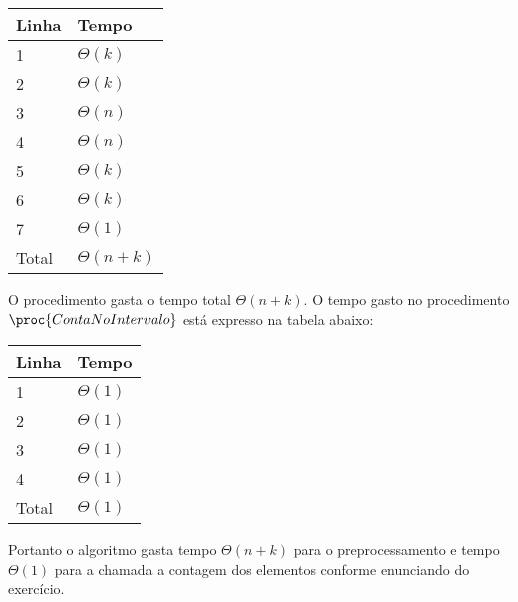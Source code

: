 \begin{table}[H]
\centering
\begin{tabular}{|l|l|}
\hline
Linha                   & Tempo \\ \hline
1 & $\Theta(k)$ \\ \hline
2 & $\Theta(k)$ \\ \hline
3 & $\Theta(n)$ \\ \hline
4 & $\Theta(n)$ \\ \hline
5 & $\Theta(k)$ \\ \hline
6 & $\Theta(k)$ \\ \hline
7 & $\Theta(1)$ \\ \hline
Total & $\Theta(n + k)$ \\ \hline
\end{tabular}
\end{table}
\noindent O procedimento gasta o tempo total $\Theta(n + k)$. O tempo gasto no 
procedimento $\proc{ContaNoIntervalo}$ está expresso na tabela abaixo:
\begin{table}[H]
\centering
\begin{tabular}{|l|l|}
\hline
Linha                   & Tempo \\ \hline
1 & $\Theta(1)$ \\ \hline
2 & $\Theta(1)$ \\ \hline
3 & $\Theta(1)$ \\ \hline
4 & $\Theta(1)$ \\ \hline
Total & $\Theta(1)$ \\ \hline
\end{tabular}
\end{table}
\noindent Portanto o algoritmo gasta tempo $\Theta(n + k)$ para o 
preprocessamento e tempo $\Theta(1)$ para a chamada a contagem dos elementos 
conforme enunciando do exercício.